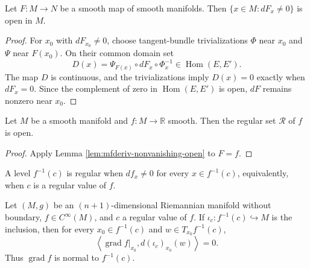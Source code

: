 \begin{lemma}
\label{lem:mfderiv-nonvanishing-open}




Let $F\colon M\to N$ be a smooth map of smooth manifolds. Then
$\{x\in M:dF_x\ne0\}$ is open in $M$.
\end{lemma}

\begin{proof}

\sketch For $x_0$ with $dF_{x_0}\ne0$, choose tangent-bundle trivializations $\Phi$
near $x_0$ and $\Psi$ near $F(x_0)$. On their common domain set
\[
D(x)=\Psi_{F(x)}\circ dF_x\circ\Phi_x^{-1}\in\operatorname{Hom}(E,E').
\]
The map $D$ is continuous, and the trivializations imply $D(x)=0$ exactly when
$dF_x=0$. Since the complement of zero in $\operatorname{Hom}(E,E')$ is open,
$dF$ remains nonzero near $x_0$.
\end{proof}

\begin{lemma}
\label{lem:regular-set-open}





Let $M$ be a smooth manifold and $f\colon M\to\mathbb R$ smooth. Then the regular
set $\mathcal R$ of $f$ is open.
\end{lemma}

\begin{proof}

\sketch Apply Lemma \ref{lem:mfderiv-nonvanishing-open} to $F=f$.
\end{proof}

A level $f^{-1}(c)$ is regular when $df_x\ne0$ for every $x\in f^{-1}(c)$,
equivalently, when $c$ is a regular value of $f$.

\begin{proposition}
\label{prop:gradient-normal-regular-level-set}





Let $(M,g)$ be an $(n+1)$-dimensional Riemannian manifold without boundary,
$f\in C^\infty(M)$, and $c$ a regular value of $f$. If
$\iota_c\colon f^{-1}(c)\hookrightarrow M$ is the inclusion, then for every
$x_0\in f^{-1}(c)$ and $w\in T_{x_0}f^{-1}(c)$,
\[
\left\langle\operatorname{grad}f|_{x_0},d(\iota_c)_{x_0}(w)\right\rangle=0.
\]
Thus $\operatorname{grad}f$ is normal to $f^{-1}(c)$.
\end{proposition}

